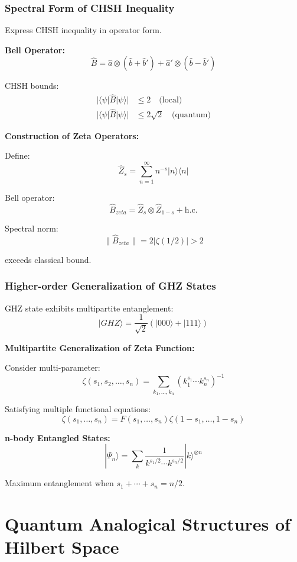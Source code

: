 \documentclass[11pt]{article}
\theoremstyle{plain}
\theoremstyle{definition}
\theoremstyle{remark}
\begin{document}
\subsubsection{Spectral Form of CHSH Inequality}

Express CHSH inequality in operator form.

\textbf{Bell Operator:}
$$\hat{B} = \hat{a} \otimes (\hat{b} + \hat{b}') + \hat{a}' \otimes (\hat{b} - \hat{b}')$$

CHSH bounds:
\begin{align}
|\langle\psi|\hat{B}|\psi\rangle| &\leq 2 \quad \text{(local)} \\
|\langle\psi|\hat{B}|\psi\rangle| &\leq 2\sqrt{2} \quad \text{(quantum)}
\end{align}

\textbf{Construction of Zeta Operators:}

Define:
$$\hat{Z}_s = \sum_{n=1}^{\infty} n^{-s} |n\rangle\langle n|$$

Bell operator:
$$\hat{B}_{zeta} = \hat{Z}_s \otimes \hat{Z}_{1-s} + \text{h.c.}$$

Spectral norm:
$$\|\hat{B}_{zeta}\| = 2|\zeta(1/2)| > 2$$

exceeds classical bound.

\subsubsection{Higher-order Generalization of GHZ States}

GHZ state exhibits multipartite entanglement:
$$|GHZ\rangle = \frac{1}{\sqrt{2}}(|000\rangle + |111\rangle)$$

\textbf{Multipartite Generalization of Zeta Function:}

Consider multi-parameter:
$$\zeta(s_1, s_2, \ldots, s_n) = \sum_{k_1, \ldots, k_n} (k_1^{s_1} \cdots k_n^{s_n})^{-1}$$

Satisfying multiple functional equations:
$$\zeta(s_1, \ldots, s_n) = F(s_1, \ldots, s_n) \zeta(1-s_1, \ldots, 1-s_n)$$

\textbf{n-body Entangled States:}
$$|\Psi_n\rangle = \sum_{k} \frac{1}{k^{s_1/2} \cdots k^{s_n/2}} |k\rangle^{\otimes n}$$

Maximum entanglement when $s_1 + \cdots + s_n = n/2$.

\section{Quantum Analogical Structures of Hilbert Space}
\end{document}
